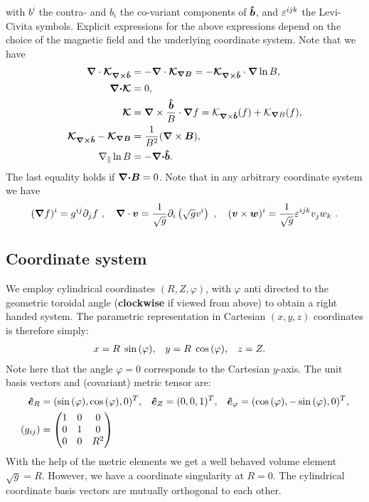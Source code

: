 with $b^i$ the contra- and $b_i$ the co-variant components of $\bm{\hat{b}}$, and
$\varepsilon^{ijk}$ the Levi-Civita symbols.
Explicit expressions for the above expressions
depend on the choice of the magnetic field and the underlying coordinate system.
Note that we have
\begin{align}
    {\boldsymbol{\nabla}}\cdot {\boldsymbol{\mathcal K_{{\boldsymbol{\nabla}}\times\bm{\hat{b}}}}}
    &= -{\boldsymbol{\nabla}}\cdot {\boldsymbol{\mathcal K_{{\boldsymbol{\nabla}}B}}} = -{\boldsymbol{ \mathcal K_{{\boldsymbol{\nabla}}\times\bm{\hat{b}}}}}\cdot{\boldsymbol{\nabla}}\ln B, \\
    {\boldsymbol{{\boldsymbol{\nabla}}\cdot}}{\boldsymbol{ \mathcal K}} &= 0, \\
    {\boldsymbol{\mathcal K}} &=
     {\boldsymbol{\nabla}}\times\frac{\bm{\hat{b}}}{B}\cdot{\boldsymbol{\nabla}} f
    = \mathcal K_{{\boldsymbol{\nabla}}\times\bm{\hat{b}}}(f) + \mathcal K_{{\boldsymbol{\nabla}} B}(f),\\
    {\boldsymbol{ \mathcal K_{{\boldsymbol{\nabla}}\times\bm{\hat{b}}}}} - {\boldsymbol{ \mathcal K_{{\boldsymbol{\nabla}} B}}} &= \frac{1}{B^2} ({\boldsymbol{\nabla}} \times {\boldsymbol{B}}), \\
    \nabla_\parallel \ln B &= -{\boldsymbol{{\boldsymbol{\nabla}}\cdot}}\bm{\hat{b}}.
    \label{eq:curl_curvature}
\end{align}
The last equality holds if ${\boldsymbol{{\boldsymbol{\nabla}}\cdot}} {\boldsymbol{B}} = 0$.
Note that in any arbitrary coordinate system we have
\begin{align}
({\boldsymbol{\nabla}} f)^i = g^{ij}\partial_j f ~, \quad
{\boldsymbol{\nabla}}\cdot {\boldsymbol{v}} = \frac{1}{\sqrt{g}}\partial_i \left(\sqrt{g} v^i\right) ~, \quad
({\boldsymbol{v}} \times {\boldsymbol{w}})^i = \frac{1}{\sqrt{g}}\varepsilon^{ijk} v_jw_k ~.
\end{align}

\subsection{Coordinate system}\label{sec:cylmetric}
We employ cylindrical coordinates \( (R,Z,\varphi) \), with \(\varphi\) anti directed to the geometric toroidal angle ({\bf clockwise} if viewed from above) to
obtain a right handed system. The parametric representation in Cartesian \((x,y,z)\) coordinates is therefore simply:
\begin{align}
 x &= R \hspace{1 mm} \sin{(\varphi)}, &
 y &= R \hspace{1 mm} \cos{(\varphi)}, &
 z &= Z .
\end{align}
Note here that the angle $\varphi = 0$ corresponds to the Cartesian $y$-axis.
The unit
basis vectors and (covariant) metric tensor are:
\begin{align}
 \bm{\hat{e}}_R      &= (\sin{(\varphi)} ,   \cos{(\varphi)},0)^T, &
 \bm{\hat{e}}_Z      &= ( 0 ,0 ,1 )^T, &
 \bm{\hat{e}}_{\varphi} &= ( \cos{(\varphi)} , -\sin{(\varphi)} , 0 )^T,
\\
    (g_{ij}) &= \begin{pmatrix}
  1 & 0 & 0 \\
  0 & 1 & 0 \\
  0 & 0 & R^2
   \end{pmatrix}
\end{align}
With the help of the metric elements we get a well behaved volume element \(\sqrt{g} = R\). However, we have a coordinate singularity at \(R=0\).
The cylindrical coordinate basis vectors are mutually orthogonal to each other.

